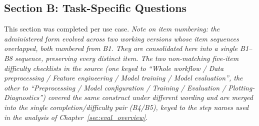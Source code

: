\subsection{Section B: Task-Specific Questions}
\label{app:stage1_task_questions}

This section was completed per use case. \emph{Note on item numbering: the administered form evolved across two working versions whose item sequences overlapped, both numbered from B1. They are consolidated here into a single B1--B8 sequence, preserving every distinct item. The two non-matching five-item difficulty checklists in the source (one keyed to ``Whole workflow / Data preprocessing / Feature engineering / Model training / Model evaluation'', the other to ``Preprocessing / Model configuration / Training / Evaluation / Plotting-Diagnostics'') covered the same construct under different wording and are merged into the single completion/difficulty pair (B4/B5), keyed to the step names used in the analysis of Chapter~\ref{sec:eval_overview}.}

